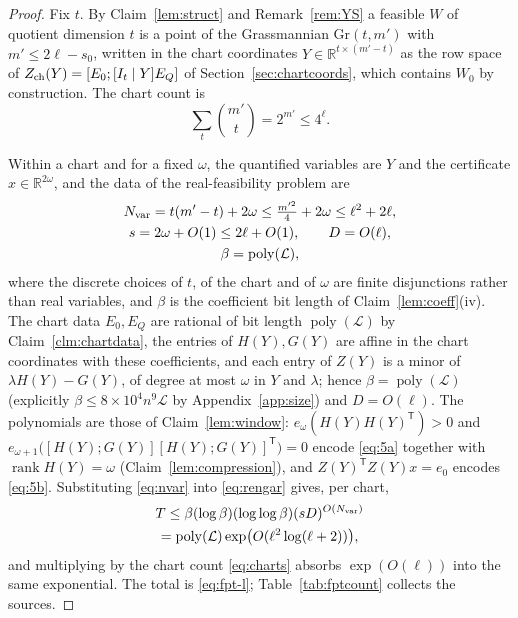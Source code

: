 \documentclass[journal]{IEEEtran}
\theoremstyle{plainn}
\theoremstyle{remark}
\begin{document}
\begin{proof}
Fix $t$. By Claim~\ref{lem:struct} and Remark~\ref{rem:YS} a feasible $W$ of quotient dimension
$t$ is a point of the Grassmannian $\mathrm{Gr}(t,m')$ with $m'\le2\ell-s_0$, written in the chart
coordinates $Y\in\mathbb R^{t\times(m'-t)}$ as the row space of
$Z_{\rm ch}(Y)=[E_0;[I_t\mid Y]E_Q]$ of Section~\ref{sec:chartcoords}, which
contains $W_0$ by construction. The chart count is
\begin{equation}\label{eq:charts}
\sum_{t}\binom{m'}{t}=2^{m'}\le4^{\ell}.
\end{equation}

Within a chart and for a fixed $\omega$, the quantified variables are $Y$ and the certificate
$x\in\mathbb R^{2\omega}$, and the data of the real-feasibility problem are
\begin{equation}\label{eq:nvar}
\begin{gathered}
N_{\rm var}=t(m'-t)+2\omega\le\tfrac{m'^2}{4}+2\omega\le\ell^2+2\ell,\\
s=2\omega+O(1)\le2\ell+O(1),\qquad D=O(\ell),\\
\beta=\operatorname{poly}(\mathcal L),
\end{gathered}
\end{equation}
where the discrete choices of $t$, of the chart and of $\omega$ are finite disjunctions rather
than real variables, and $\beta$ is the coefficient bit length of Claim~\ref{lem:coeff}(iv). The chart
data $E_0,E_Q$ are rational of bit length $\operatorname{poly}(\mathcal L)$ by
Claim~\ref{clm:chartdata}, the entries of $H(Y),G(Y)$ are affine in the chart coordinates with these
coefficients, and each entry of $Z(Y)$ is a minor of $\lambda H(Y)-G(Y)$, of degree at most $\omega$ in
$Y$ and $\lambda$; hence $\beta=\operatorname{poly}(\mathcal L)$ (explicitly $\beta\le8\times10^4n^9\mathcal L$ by
Appendix~\ref{app:size}) and $D=O(\ell)$. The polynomials are
those of Claim~\ref{lem:window}: $e_\omega(H(Y)H(Y)^{\mathsf T})>0$ and
$e_{\omega+1}\bigl([H(Y);G(Y)][H(Y);G(Y)]^{\mathsf T}\bigr)=0$ encode \eqref{eq:5a} together with
$\operatorname{rank}H(Y)=\omega$ (Claim~\ref{lem:compression}), and
$Z(Y)^{\mathsf T}Z(Y)x=e_0$ encodes \eqref{eq:5b}. Substituting \eqref{eq:nvar} into \eqref{eq:rengar} gives, per
chart,
\begin{equation*}
\begin{gathered}
T\le\beta(\log\beta)(\log\log\beta)(sD)^{O(N_{\rm var})}\\
=\operatorname{poly}(\mathcal L)\exp\bigl(O(\ell^2\log(\ell+2))\bigr),
\end{gathered}
\end{equation*}
and multiplying by the chart count \eqref{eq:charts} absorbs $\exp(O(\ell))$ into the same
exponential. The total is \eqref{eq:fpt-l}; Table~\ref{tab:fptcount} collects the sources.


\end{proof}
\end{document}
